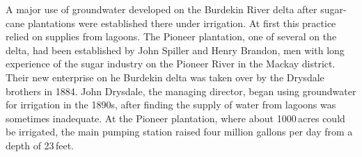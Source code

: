 A major use of groundwater developed on the Burdekin River
 delta after sugar-cane plantations were
established there under irrigation.  At first this practice relied on
supplies from lagoons.  The Pioneer plantation, one of several on the
delta, had been established by John Spiller and  Henry
Brandon,  men with long experience of the sugar
industry on the Pioneer River  in the Mackay
district.  Their new enterprise on he Burdekin delta was taken over by
the Drysdale brothers  in 1884.  John Drysdale,
the managing director, began using groundwater for irrigation in the
1890s, after finding the supply of water from lagoons was sometimes
inadequate.  At the Pioneer plantation, where about 1000\,acres could
be irrigated, the main pumping station raised four million gallons per
day from a depth of 23\,feet.


